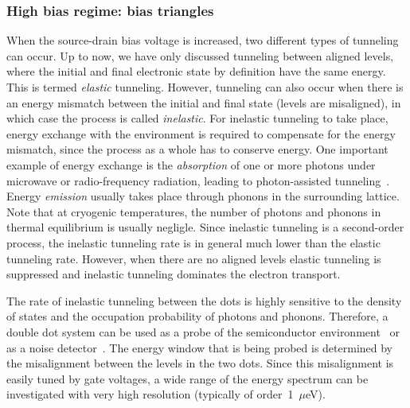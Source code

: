 \documentclass[12pt,aps,nofootinbib]{revtex4-1}
\begin{document}
\subsubsection{High bias regime: bias triangles}
When the source-drain bias voltage is increased, two different
types of tunneling can occur. Up to now, we have only discussed
tunneling between aligned levels, where the initial and final
electronic state by definition have the same energy. This is
termed \textit{elastic} tunneling. However, tunneling can also
occur when there is an energy mismatch between the initial and
final state (levels are misaligned), in which case the process is
called \textit{inelastic}. For inelastic tunneling to take place,
energy exchange with the environment is required to compensate for
the energy mismatch, since the process as a whole has to conserve
energy. One important example of energy exchange is the
\textit{absorption} of one or more photons under microwave or
radio-frequency radiation, leading to photon-assisted
tunneling~\cite{WielRMP2003}. Energy \textit{emission} usually
takes place through phonons in the surrounding lattice. Note that
at cryogenic temperatures, the number of photons and phonons in
thermal equilibrium is usually negligle. Since inelastic tunneling
is a second-order process, the inelastic tunneling rate is in
general much lower than the elastic tunneling rate. However, when
there are no aligned levels elastic tunneling is suppressed and
inelastic tunneling dominates the electron transport.

The rate of inelastic tunneling between the dots is highly
sensitive to the density of states and the occupation probability
of photons and phonons. Therefore, a double dot system can be used
as a probe of the semiconductor environment~\cite{WielRMP2003} or
as a noise detector~\cite{AguadoPRL2000,OnacPRL2006}. The energy
window that is being probed is determined by the misalignment
between the levels in the two dots. Since this misalignment is
easily tuned by gate voltages, a wide range of the energy spectrum
can be investigated with very high resolution (typically of
order~1~$\mu$eV).
\end{document}
